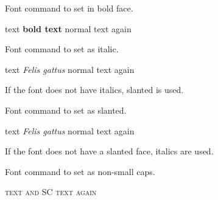 \documentclass{article}
\begin{document}
\begin{docCommands}[
doc no index, %
doc name = textbf,
doc parameter = \marg{text},
doc description=font,
] {}
Font command to set  in bold face.
\begin{dispExample}
  text \textbf{bold text} normal text again
\end{dispExample}
\end{docCommands}

\begin{docCommands}[
doc no index, %
doc name = textit,
doc parameter = \marg{text},
doc description=font,
] {}
Font command to set  as italic.
\begin{dispExample}
  text \textit{Felis gattus} normal text again
\end{dispExample}
\end{docCommands}
If the font does not have italics, slanted is used.


\begin{docCommands}[
doc no index, %
doc name = textsl,
doc parameter = \marg{text},
doc description=font,
] {}
Font command to set  as slanted.
\begin{dispExample}
  \sffamily text \textsl{Felis gattus} normal text again
\end{dispExample}
\end{docCommands}
If the font does not have a slanted face, italics are used.

\begin{docCommands}[
doc no index, %
doc name = textulc,
doc parameter = \marg{text},
doc description=font,
] {}
Font command to set  as non-small caps.
\begin{dispExample}
  \scshape text  and SC text again
\end{dispExample}
\end{docCommands}


\end{document}
